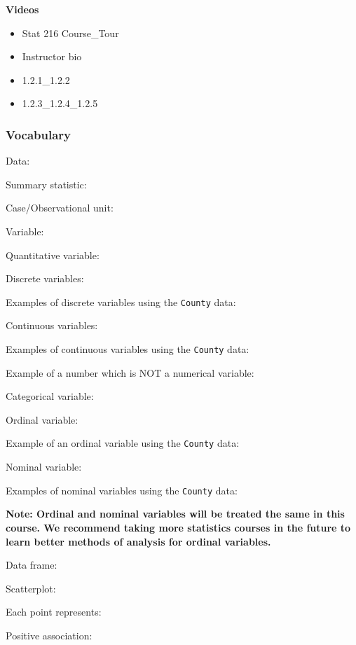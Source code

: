 \documentclass[
]{report}
\providecommand{\tightlist}{%
  \setlength{\itemsep}{0pt}\setlength{\parskip}{0pt}}
\newcommand{\rgs}{\vspace{12pt}} %
\newcommand{\rgi}{\hspace{24pt}}  %
\begin{document}
\textbf{Videos}

\begin{itemize}
\tightlist
\item
  Stat 216 Course\_Tour
\item
  Instructor bio
\item
  1.2.1\_1.2.2
\item
  1.2.3\_1.2.4\_1.2.5
\end{itemize}


\hypertarget{vocabulary}{%
\subsubsection*{Vocabulary}\label{vocabulary}}

Data:
\rgs

Summary statistic:
\rgs

Case/Observational unit:
\rgs

Variable:
\rgs

\rgi Quantitative variable:
\rgs

\rgi Discrete variables:
\rgs

\rgi \rgi Examples of discrete variables using the \texttt{County} data:
\rgs

\rgi Continuous variables:
\rgs

\rgi \rgi Examples of continuous variables using the \texttt{County} data:
\rgs

Example of a number which is NOT a numerical variable:
\rgs

Categorical variable:
\rgs

\rgi Ordinal variable:
\rgs

\rgi \rgi Example of an ordinal variable using the \texttt{County} data:
\rgs

\rgi Nominal variable:
\rgs

\rgi \rgi Examples of nominal variables using the \texttt{County} data:

\rgs

\textbf{Note: Ordinal and nominal variables will be treated the same in this course. We recommend taking more statistics courses in the future to learn better methods of analysis for ordinal variables.}

Data frame:
\rgs

Scatterplot:
\rgs

\rgi Each point represents:

\rgi Positive association:
\end{document}
